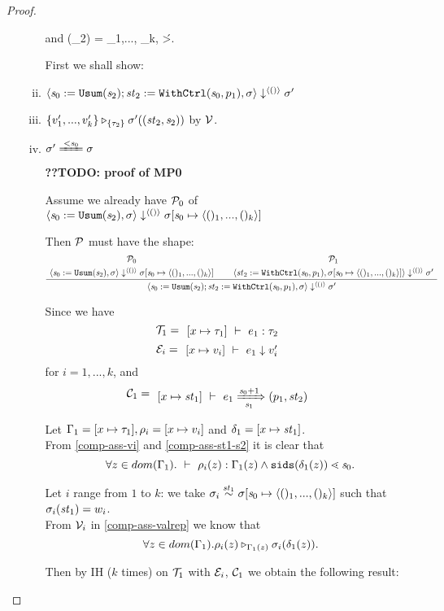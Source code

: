 \begin{proof}
\begin{itemize}
\begin{enumerate}[(i)]
    and 
    {\sgm(\s_2) = \< \F_1,..., \F_k, \T \'>.}
    
   
   
\def\stwo{\< \F_1,..., \F_k, \T \'>}
\def\sgmszs{\sgm[\s_0 \|-> \<()_1,...,()_k \'>, \st_2 \>-> \sgm''(\st_2)]}

	First we shall show: 
	\item $\seval{\sdef{\s_0}{\usum(\s_2)}; \withctrl{\s_0}{p_1}{\st_2}}{\sgm}{\singl{()}}{\sgm'}$
	\item $\ValRep{\Seqk{v'}}{\tseq{\tau_2}}{\sgm'((\st_2,\s_2))}$ by $\MV$. \\
	\item $\sgm' \ConEq{\s_0} \sgm$
	
	\textbf{??TODO: proof of MP0}
	
	Assume we already have 
	$\MP_0$ of $ \seval{\sdef{\s_0}{\usum(\s_2)}} {\sgm} {\singl{()}}
	{\sgmsz}$
	
	Then $\MP$ must have the shape:
	$$ \PT{
		\UCN{\MP_0}{\seval{\sdef{\s_0}{\usum(\s_2)}}{\sgm}{\singl{()}}{\sgm[\s_0 \|-> \vrange{()_1}{()_k}]}}
		\UCN{\MP_1}{\seval{\withctrl{\s_0}{p_1}{\st_2}}{\sgm[\s_0 \|-> \vrange{()_1}{()_k}]}{\<()\'>}{\sgm'}}
		\BC{\seval{\sdef{\s_0}{\usum(\s_2)}; \withctrl{\s_0}{p_1}{\st_2}}{\sgm}{\singl{()}}{\sgm'}}
	} $$
	
	Since we have 
	$$\MT_1 = \PT{\AC{\Type{[x \|-> {\tau_1}]}{e_1}{\tau_2}}}$$
	$$\ME_i = \PT{\AC{\Eval{[x \|-> {v_i}]}{e_1}{v_i'}}}$$ for $i = 1,...,k$, and 
	$$\MC_1 = \PT{\AC{\Trans{[x \|-> {\st_1}]}{e_1}{\s_0+1}{\s_1}{\sfun{p_1}{\st_2}}}}$$
	
	Let $\Gam_1 = [x \|-> \tau_1], \rho_i= [x \|-> v_i]$ and $\del_1 = [x \|-> \st_1]$. \\
	From \eqref{comp-ass-vi} and \eqref{comp-ass-st1-s2} it is clear that 
	$$\forall z \in dom(\Gam_1). \Type{}{\rho_i(z)}{\Gam_1(z)} \wedge 
	\sids{\del_1(z)} \.< \s_0 .$$
	
	Let $i$ range from $1$ to $k$: we take $\sgm_i \~{\st_1} \sgm[\s_0 \|-> \<()_1,...,()_k \'>]$ 
	such that $\sgm_i(\st_1)= w_i$. \\
	From $\MV_i$ in \eqref{comp-ass-valrep} we know that  
	$$\forall z \in dom(\Gam_1). \ValRep{\rho_i(z)}{\Gam_1(z)}{\sgm_i(\del_1(z))}.$$
	
	
	Then  by IH ($k$ times) on $\MT_1$ with $\ME_i$, 
	$\MC_1$ we obtain the following result:



\end{enumerate}
\end{itemize}
\end{proof}
